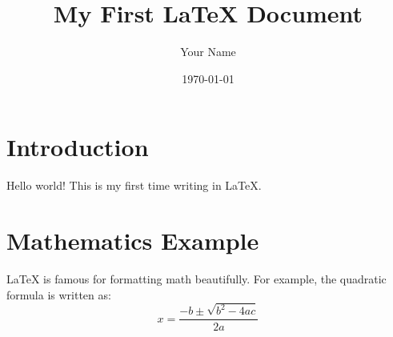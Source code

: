 \documentclass{article}
\begin{document}
\title{My First LaTeX Document}
\author{Your Name}
\date{\today}
\maketitle

\section{Introduction}
Hello world! This is my first time writing in \LaTeX. 

\section{Mathematics Example}
LaTeX is famous for formatting math beautifully. For example, the quadratic formula is written as:
\begin{equation}
    x = \frac{-b \pm \sqrt{b^2 - 4ac}}{2a}
\end{equation}
\end{document}
